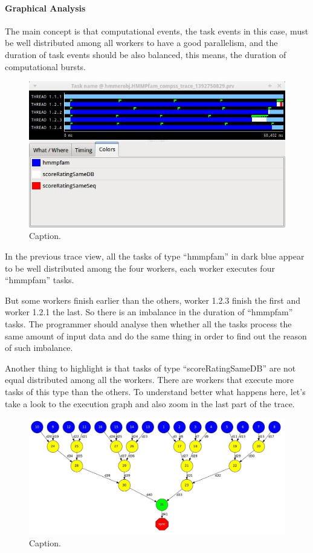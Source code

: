 \paragraph{Graphical Analysis}
The main concept is that computational events, the task events in this case, must be well 
distributed among all workers to have a good parallelism, and the duration of task events 
should be also balanced, this means, the duration of computational bursts.

\begin{figure}[ht!]
  \centering
    \includegraphics[width=1.0\textwidth]{./Sections/4_Tools/Figures/8.jpeg}
    \caption{Caption.}
\end{figure}

In the previous trace view, all the tasks of type ``hmmpfam'' in dark blue appear to be well 
distributed among the four workers, each worker executes four ``hmmpfam'' tasks.

But some workers finish earlier than the others, worker 1.2.3 finish the first and worker 1.2.1 
the last. So there is an imbalance in the duration of ``hmmpfam'' tasks. The programmer should 
analyse then whether all the tasks process the same amount of input data and do the same thing 
in order to find out the reason of such imbalance.

Another thing to highlight is that tasks of type ``scoreRatingSameDB'' are not equal distributed 
among all the workers. There are workers that execute more tasks of this type than the others. 
To understand better what happens here, let’s take a look to the execution graph and also zoom 
in the last part of the trace.

\begin{figure}[ht!]
  \centering
    \includegraphics[width=1.0\textwidth]{./Sections/4_Tools/Figures/9.jpeg}
    \caption{Caption.}
\end{figure}

